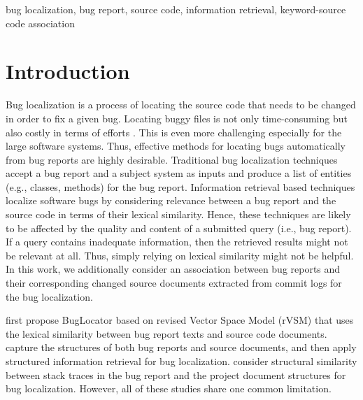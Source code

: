 \documentclass[conference]{IEEEtran}
\begin{document}
\begin{IEEEkeywords}
bug localization, bug report, source code, information retrieval, keyword-source code association
\end{IEEEkeywords}

\section{Introduction}
Bug localization is a process of locating the source code that needs to be changed in order to fix a given bug. 
Locating buggy files is not only time-consuming but also costly in terms of efforts \cite{Wang}. This is even more challenging especially for the large software systems. Thus, effective methods for locating bugs automatically from bug reports are highly desirable. 
Traditional bug localization techniques accept a bug report and a subject system as inputs and produce a list of entities (e.g., classes, methods) for the bug report. Information retrieval based techniques localize software bugs by considering relevance between a bug report and the source code in terms of their lexical similarity. %
Hence, these techniques are likely to be affected by the quality and content of a submitted query (i.e., bug report). If a query contains inadequate information, then the retrieved results might not be relevant at all. Thus, simply relying on lexical similarity might not be helpful. 
In this work, we additionally consider an association between bug reports and their corresponding changed source documents extracted from commit logs for the bug localization.

\citet{Jian} first propose BugLocator based on revised Vector Space Model (rVSM) that uses the lexical similarity between bug report texts and source code documents. \citet{Saha} capture the structures of both bug reports and source documents, and then apply structured information retrieval for bug localization. \citet{Moreno} consider structural similarity between stack traces in the bug report and the project document structures for bug localization. However, all of these studies share one common limitation.
\end{document}
